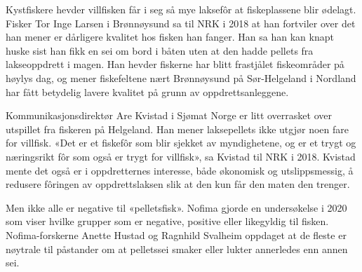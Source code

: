 Kystfiskere hevder villfisken får i seg så mye laksefôr at fiskeplassene blir ødelagt. Fisker Tor Inge Larsen i Brønnøysund sa til NRK i 2018 at han fortviler over det han mener er dårligere kvalitet hos fisken han fanger. Han sa han kan knapt huske sist han fikk en sei om bord i båten uten at den hadde pellets fra lakseoppdrett i magen. Han hevder fiskerne har blitt frastjålet fiskeområder på høylys dag, og mener fiskefeltene nært Brønnøysund på Sør-Helgeland i Nordland har fått betydelig lavere kvalitet på grunn av oppdrettsanleggene. \cite{Olsen m.fl. 2018}

Kommunikasjonsdirektør Are Kvistad i Sjømat Norge er litt overrasket over utspillet fra fiskeren på Helgeland. Han mener laksepellets ikke utgjør noen fare for villfisk. «Det er et fiskefôr som blir sjekket av myndighetene, og er et trygt og næringsrikt fôr som også er trygt for villfisk», sa Kvistad til NRK i 2018. Kvistad mente det også er i oppdretternes interesse, både økonomisk og utslippsmessig, å redusere fôringen av oppdrettslaksen slik at den kun får den maten den trenger. \cite{Olsen m.fl. 2018}


Men ikke alle er negative til «pelletsfisk». Nofima gjorde en undersøkelse i 2020 som viser hvilke grupper som er negative, positive eller likegyldig til fisken. Nofima-forskerne Anette Hustad og Ragnhild Svalheim oppdaget at de fleste er nøytrale til påstander om at pelletssei smaker eller lukter annerledes enn annen sei. \cite{Hustad og Svalheim 2020}

